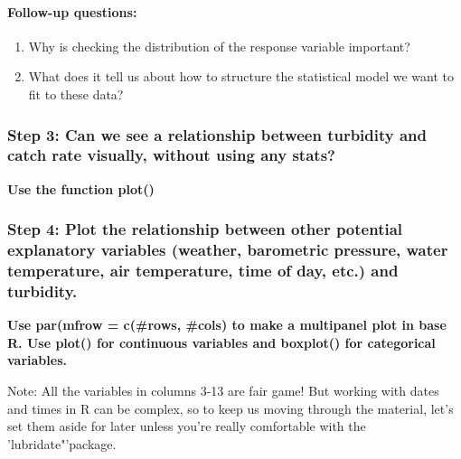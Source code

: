 \documentclass[]{article}
\providecommand{\tightlist}{%
  \setlength{\itemsep}{0pt}\setlength{\parskip}{0pt}}
\let\oldparagraph\paragraph
\renewcommand{\paragraph}[1]{\oldparagraph{#1}\mbox{}}
\begin{document}
\hypertarget{follow-up-questions}{%
\paragraph{Follow-up questions:}\label{follow-up-questions}}

\begin{enumerate}
\def\labelenumi{\arabic{enumi}.}
\tightlist
\item
  Why is checking the distribution of the response variable important?
\item
  What does it tell us about how to structure the statistical model we
  want to fit to these data?
\end{enumerate}

\hypertarget{step-3-can-we-see-a-relationship-between-turbidity-and-catch-rate-visually-without-using-any-stats}{%
\subsubsection{Step 3: Can we see a relationship between turbidity and
catch rate visually, without using any
stats?}\label{step-3-can-we-see-a-relationship-between-turbidity-and-catch-rate-visually-without-using-any-stats}}

\textbf{Use the function plot()}

\hypertarget{step-4-plot-the-relationship-between-other-potential-explanatory-variables-weather-barometric-pressure-water-temperature-air-temperature-time-of-day-etc.-and-turbidity.}{%
\subsubsection{Step 4: Plot the relationship between other potential
explanatory variables (weather, barometric pressure, water temperature,
air temperature, time of day, etc.) and
turbidity.}\label{step-4-plot-the-relationship-between-other-potential-explanatory-variables-weather-barometric-pressure-water-temperature-air-temperature-time-of-day-etc.-and-turbidity.}}

\textbf{Use par(mfrow = c(\#rows, \#cols) to make a multipanel plot in
base R. Use plot() for continuous variables and boxplot() for
categorical variables.}

Note: All the variables in columns 3-13 are fair game! But working with
dates and times in R can be complex, so to keep us moving through the
material, let's set them aside for later unless you're really
comfortable with the 'lubridate"'package.
\end{document}
